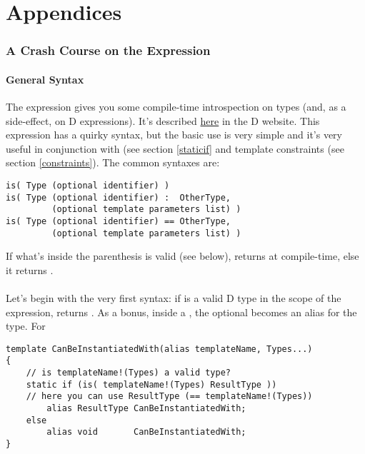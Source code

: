 \newpage
\part*{Appendices}
\appendix
\section{A Crash Course on the  Expression}\label{isexpression}

\subsection{General Syntax} \label{issyntax}

The  expression gives you some compile-time introspection on types (and, as a side-effect, on D expressions). It's described \href{http://www.d-programming-language.org/expression.html#IsExpression}{here} in the D website. This expression has a quirky syntax, but the basic use is very simple and it's very useful in conjunction with  (see section \ref{staticif} and template constraints (see section \ref{constraints}). The common syntaxes are:

\begin{verbatim}
is( Type (optional identifier) )
is( Type (optional identifier) :  OtherType, 
         (optional template parameters list) )
is( Type (optional identifier) == OtherType, 
         (optional template parameters list) )
\end{verbatim}

If what's inside the parenthesis is valid (see below), \DD{()} returns  at compile-time, else it returns .

\subsection{} \label{istype}

Let's begin with the very first syntax: if  is a valid D type in the scope of the  expression, \DD{()} returns . As a bonus, inside a , the optional  becomes an alias for the type. For 

\begin{verbatim}
template CanBeInstantiatedWith(alias templateName, Types...)
{
    // is templateName!(Types) a valid type?
    static if (is( templateName!(Types) ResultType ))
    // here you can use ResultType (== templateName!(Types))
        alias ResultType CanBeInstantiatedWith;
    else
        alias void       CanBeInstantiatedWith;
}
\end{verbatim}


